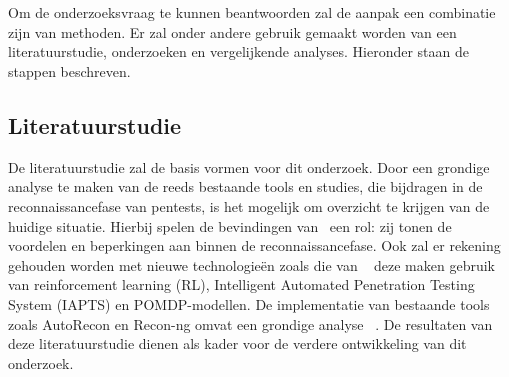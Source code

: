 
\chapter{}%
\label{ch:methodologie}


Om de onderzoeksvraag te kunnen beantwoorden zal de aanpak een combinatie zijn van methoden. Er zal onder andere gebruik
gemaakt worden van een literatuurstudie, onderzoeken en vergelijkende analyses. Hieronder staan de stappen beschreven.

\section{Literatuurstudie}

De literatuurstudie zal de basis vormen voor dit onderzoek. Door een grondige analyse te maken van de reeds bestaande tools en studies,
die bijdragen in de reconnaissancefase van pentests, is het mogelijk om overzicht te krijgen van de huidige situatie.
Hierbij spelen de bevindingen van~\textcite{Shah,Kothia,otherShah2019} een rol: zij tonen de voordelen en beperkingen aan binnen de reconnaissancefase.
Ook zal er rekening gehouden worden met nieuwe technologieën zoals die van ~\textcite{Ghanem,Hoang,Monero2025} deze maken gebruik van
reinforcement learning (RL), Intelligent Automated Penetration Testing System (IAPTS) en POMDP-modellen. De implementatie van bestaande
tools zoals AutoRecon en Recon-ng omvat een grondige analyse ~\autocite{Shebli}.
De resultaten van deze literatuurstudie dienen als kader voor de verdere ontwikkeling van dit onderzoek.

